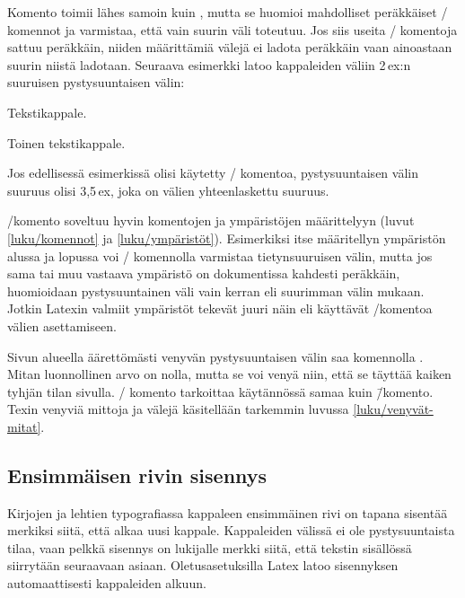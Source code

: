 \noindent
Komento  toimii lähes samoin kuin ,
mutta se huomioi mahdolliset peräkkäiset \-/ komennot
ja varmistaa, että vain suurin väli toteutuu. Jos siis useita
\-/ komentoja sattuu peräkkäin, niiden määrittämiä
välejä ei ladota peräkkäin vaan ainoastaan suurin niistä ladotaan.
Seuraava esimerkki latoo kappaleiden väliin 2\,ex:n suuruisen
pystysuuntaisen välin:

\begin{koodilohkosis}
Tekstikappale.

\addvspace{1ex} \addvspace{2ex} \addvspace{.5ex}
Toinen tekstikappale.
\end{koodilohkosis}

\noindent
Jos edellisessä esimerkissä olisi käytetty \-/ komentoa,
pystysuuntaisen välin suuruus olisi 3,5\,ex, joka on välien
yhteenlaskettu suuruus.

\-/komento soveltuu hyvin komentojen ja ympäristöjen
määrittelyyn (luvut \ref{luku/komennot} ja \ref{luku/ympäristöt}).
Esimerkiksi itse määritellyn ympäristön alussa ja lopussa voi
\-/ komennolla varmistaa tietynsuuruisen välin, mutta
jos sama tai muu vastaava ympäristö on dokumentissa kahdesti peräkkäin,
huomioidaan pystysuuntainen väli vain kerran eli suurimman välin mukaan.
Jotkin Latexin valmiit ympäristöt tekevät juuri näin eli käyttävät
\-/komentoa välien asettamiseen.

Sivun alueella äärettömästi venyvän pystysuuntaisen välin saa komennolla
. Mitan luonnollinen arvo on nolla, mutta se voi venyä
niin, että se täyttää kaiken tyhjän tilan sivulla. \-/
komento tarkoittaa käytännössä samaa kuin
 \=/komento. Texin venyviä
mittoja ja välejä käsitellään tarkemmin luvussa
\ref{luku/venyvät-mitat}.

\subsection{Ensimmäisen rivin sisennys}
\label{luku/ensimmäisen-rivin-sisennys}

Kirjojen ja lehtien typografiassa kappaleen ensimmäinen rivi on tapana
sisentää merkiksi siitä, että alkaa uusi kappale. Kappaleiden välissä ei
ole pystysuuntaista tilaa, vaan pelkkä sisennys on lukijalle merkki
siitä, että tekstin sisällössä siirrytään seuraavaan asiaan.
Oletusasetuksilla Latex latoo sisennyksen automaattisesti kappaleiden
alkuun.

